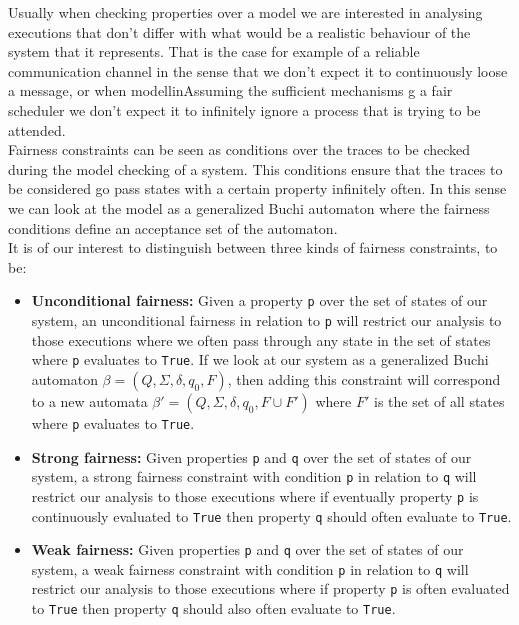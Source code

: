 \documentclass[12pt]{article}
\begin{document}
Usually when checking properties over a model we are interested in analysing 
executions that don't differ with what would be a realistic behaviour of the
system that it represents. That is the case for example of a reliable
communication channel in the sense that we don't expect it to continuously
loose a message, or when modellinAssuming the sufficient mechanisms \cite{falluto2.0}g a fair scheduler we don't expect it to
infinitely ignore a process that is trying to be attended.\\
Fairness constraints can be seen as conditions over the traces to be checked
during the model checking of a system. This conditions ensure that the traces %
to be considered go pass states with a certain property infinitely often. In
this sense we can look at the model as a generalized Buchi automaton where
the fairness conditions define an acceptance set of the automaton.\\
It is of our interest to distinguish between three kinds of fairness
constraints, to be:
\begin{itemize}

\item \textbf{Unconditional fairness:} Given a property \texttt{p} over the
set of states of our system, an unconditional fairness in relation to
\texttt{p} will restrict our analysis to those executions where we often pass
through any state in the set of states where \texttt{p} evaluates to
\texttt{True}. If we look at our system as a generalized Buchi automaton
$\beta=(Q,\Sigma,\delta,q_{0},F)$, then adding this constraint will correspond
to a new automata $\beta'=(Q,\Sigma,\delta,q_{0},F\cup F')$ where $F'$ is the
set of all states where \texttt{p} evaluates to \texttt{True}. 

\item \textbf{Strong fairness:} Given properties \texttt{p} and \texttt{q}
over the set of states of our system, a strong fairness constraint with
condition \texttt{p} in relation to \texttt{q} will restrict our analysis
to those executions where if eventually property \texttt{p} is continuously
evaluated to \texttt{True} then property \texttt{q} should often evaluate
to \texttt{True}. %

\item \textbf{Weak fairness:} Given properties \texttt{p} and \texttt{q}
over the set of states of our system, a weak fairness constraint with
condition \texttt{p} in relation to \texttt{q} will restrict our analysis
to those executions where if property \texttt{p} is often evaluated to 
\texttt{True} then property \texttt{q} should also often evaluate to
\texttt{True}. %

\end{itemize}
\end{document}

